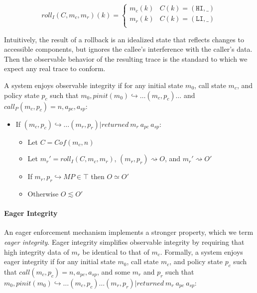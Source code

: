\documentclass{article}
\begin{document}
      \[\mathit{roll}_I(C,m_c,m_r)(k) =
      \begin{cases}
        m_c(k) & C(k) = (\mathtt{HI},\_) \\
        m_r(k) & C(k) = (\mathtt{LI},\_) \\
      \end{cases}\]

      Intuitively, the result of a rollback is an idealized state that reflects changes to accessible
      components, but ignores the callee's interference with the caller's data. Then the observable
      behavior of the resulting trace is the standard to which we expect any real trace to conform.

      A system enjoys observable integrity if for any initial state \(m_0\), call state \(m_c\),
      and policy state \(p_c\) such that \(m_0,\mathit{pinit}(m_0) \hookrightarrow \dots (m_c,p_c) \dots\)
      and \(\mathit{call}_P(m_c,p_c) = n,a_{pc},a_{sp}\):

      \begin{itemize}
        \item If \((m_c,p_c) \hookrightarrow \dots (m_r,p_r) | \mathit{returned}\ m_r\ a_{pc}\ a_{sp}\):
          \begin{itemize}
            \item Let \(C = \mathit{Cof}(m_c,n)\)
            \item Let \(m_r' = \mathit{roll}_I(C,m_c,m_r)\), \((m_r,p_r) \rightsquigarrow O\), and
              \(m_r' \rightsquigarrow O'\)
            \item If \(m_r,p_r \hookrightarrow MP \in \top\) then \(O \simeq O'\)
            \item Otherwise \(O \lesssim O'\)
          \end{itemize}
      \end{itemize}

    \paragraph{Eager Integrity}
 
      An eager enforcement mechanism implements a stronger property, which we term {\it eager integrity}.
      Eager integrity simplifies observable integrity by requiring that high integrity data of \(m_r\) be
      identical to that of \(m_c\). Formally, a system enjoys eager integrity if for any initial state
      \(m_0\), call state \(m_c\), and policy state \(p_c\) such that \(\mathit{call}(m_c,p_c) =
      n, a_{pc}, a_{sp}\), and some \(m_r\) and \(p_r\) such that
      \(m_0,\mathit{pinit}(m_0) \hookrightarrow \dots (m_c,p_c) \dots (m_r,p_r) | \mathit{returned}\ m_r\ a_{pc}\ a_{sp}\):
\end{document}
